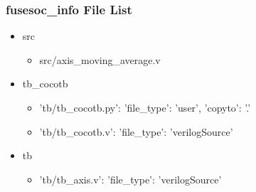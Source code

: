 \subsubsection{fusesoc\_info File List}
\begin{itemize}
\item src
	\begin{itemize}
	\item src/axis\_moving\_average.v
	\end{itemize}
\item tb\_cocotb
	\begin{itemize}
	\item {'tb/tb\_cocotb.py': {'file\_type': 'user', 'copyto': '.'}}
	\item {'tb/tb\_cocotb.v': {'file\_type': 'verilogSource'}}
	\end{itemize}
\item tb
	\begin{itemize}
	\item {'tb/tb\_axis.v': {'file\_type': 'verilogSource'}}
	\end{itemize}
\end{itemize}
